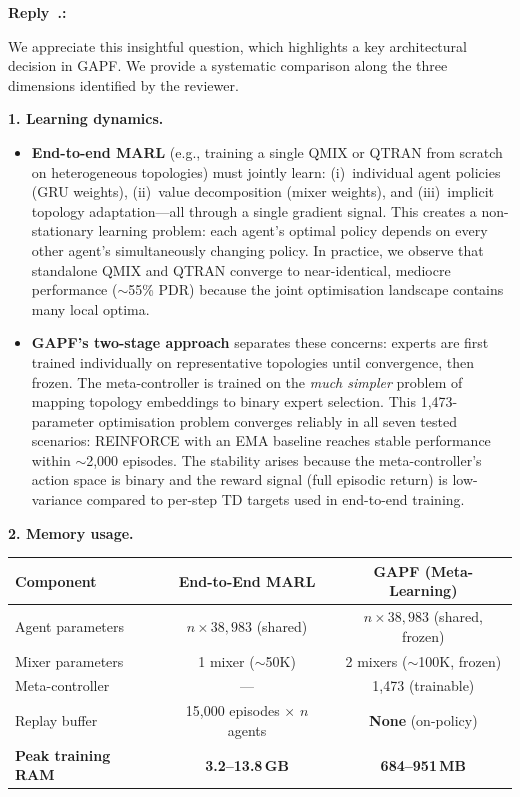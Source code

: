 \documentclass[11pt]{article}
\newcounter{reviewer}
\newcounter{replyctr}[reviewer]
\renewcommand{\thereplyctr}{\thereviewer.\arabic{replyctr}}
\newenvironment{reply}
  {\refstepcounter{replyctr}%
   \addtocounter{replyctr}{-1}%
   \medskip\noindent
   \begin{sf}\textbf{Reply~\thereplyctr:}\ }
  {\addtocounter{replyctr}{1}%
   \medskip\end{sf}}
\begin{document}
\begin{reply}
\begin{mdframed}[style=Resp]
We appreciate this insightful question, which highlights a key architectural decision in GAPF. We provide a systematic comparison along the three dimensions identified by the reviewer.

\medskip
\noindent\textbf{1. Learning dynamics.}

\begin{itemize}[nosep]
    \item \textbf{End-to-end MARL} (e.g., training a single QMIX or QTRAN from scratch on heterogeneous topologies) must jointly learn: (i)~individual agent policies (GRU weights), (ii)~value decomposition (mixer weights), and (iii)~implicit topology adaptation---all through a single gradient signal. This creates a non-stationary learning problem: each agent's optimal policy depends on every other agent's simultaneously changing policy. In practice, we observe that standalone QMIX and QTRAN converge to near-identical, mediocre performance ($\sim$55\% PDR) because the joint optimisation landscape contains many local optima.
    
    \item \textbf{GAPF's two-stage approach} separates these concerns: experts are first trained individually on representative topologies until convergence, then frozen. The meta-controller is trained on the \emph{much simpler} problem of mapping topology embeddings to binary expert selection. This 1{,}473-parameter optimisation problem converges reliably in all seven tested scenarios: REINFORCE with an EMA baseline reaches stable performance within $\sim$2{,}000 episodes. The stability arises because the meta-controller's action space is binary and the reward signal (full episodic return) is low-variance compared to per-step TD targets used in end-to-end training.
\end{itemize}

\medskip
\noindent\textbf{2. Memory usage.}

\begin{center}
\begin{tabular}{lcc}
\toprule
\textbf{Component} & \textbf{End-to-End MARL} & \textbf{GAPF (Meta-Learning)} \\
\midrule
Agent parameters & $n \times 38{,}983$ (shared) & $n \times 38{,}983$ (shared, frozen) \\
Mixer parameters & 1 mixer ($\sim$50K) & 2 mixers ($\sim$100K, frozen) \\
Meta-controller & --- & 1{,}473 (trainable) \\
\midrule
Replay buffer & 15{,}000 episodes $\times$ $n$ agents & \textbf{None} (on-policy) \\
\midrule
\textbf{Peak training RAM} & \textbf{3.2--13.8\,GB} & \textbf{684--951\,MB} \\
\bottomrule
\end{tabular}
\end{center}


\end{mdframed}
\end{reply}
\end{document}
